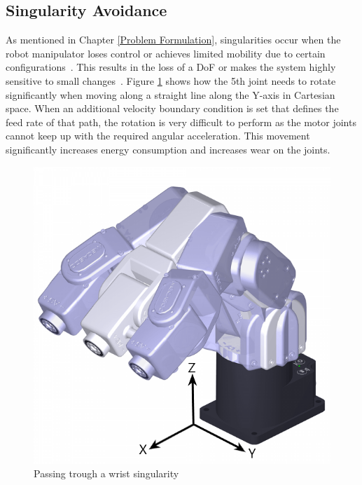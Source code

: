 \subsection{Singularity Avoidance}\label{Singularity avoidance}
As mentioned in Chapter \ref{Problem Formulation}, singularities occur when the robot manipulator loses control or achieves limited mobility due to certain configurations~\cite{Malyshev.2022}. This results in the loss of a \acrshort{DoF} or makes the system highly sensitive to small changes~\cite{Zhao.2021, Milenkovic.2021}.
Figure \ref{wristsingular} shows how the 5th joint needs to rotate significantly when moving along a straight line along the Y-axis in Cartesian space. When an additional velocity boundary condition is set that defines the feed rate of that path, the rotation is very difficult to perform as the motor joints cannot keep up with the required angular acceleration. This movement significantly increases energy consumption and increases wear on the joints. 



\begin{figure}[H]
	\centerline{\includegraphics[scale=.45]{figures/wristsingular.png}}
	\caption{Passing trough a wrist singularity~\cite{meca}}
	\label{wristsingular}
\end{figure}

